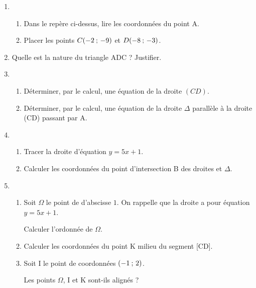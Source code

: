 \documentclass[12pt,french]{article}
\begin{document}
\begin{enumerate}[label=\arabic*.]
\item 	\begin{enumerate}[label=\alph*)]
	\item Dans le repère ci-dessus, lire les coordonnées du point A.
	
	\item Placer les points $C(-2\: ; \, -9)$ et $D(-8\: ; \, -3)$.
	\end{enumerate}
	
\item Quelle est la nature du triangle ADC ? Justifier.

\item\begin{enumerate}[label=\alph*)]
	\item Déterminer, par le calcul, une équation de la droite $(CD)$.
	
	\item Déterminer, par le calcul, une équation de la droite $\Delta$ parallèle à la droite (CD) passant par A.
			
	\end{enumerate}

\item \begin{enumerate}[label=\alph*)]
	\item Tracer la droite  d'équation $y=5x+1$.
	
	\item Calculer les coordonnées du point d'intersection B des droites  et $\Delta$.	
		
	\end{enumerate}	

\item \begin{enumerate}[label=\alph*)]
	\item Soit $\Omega$ le point de  d'abscisse $1$. On rappelle que la droite   a pour équation $y=5x+1$.\par 
	 Calculer l'ordonnée de $\Omega$.
	
	\item Calculer les coordonnées du point K milieu du segment [CD].
	
	\item Soit I le point de coordonnées $(-1 \: ; \, 2)$.\par 
	Les points $\Omega$, I et K sont-ils alignés ?
	
		
	\end{enumerate}
	
	
	
\end{enumerate}
\end{document}
